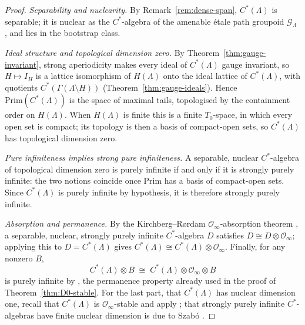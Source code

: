 \documentclass[12pt]{amsart}
\theoremstyle{plain}
\theoremstyle{definition}
\theoremstyle{remark}
\newcommand{\Prim}{\mathrm{Prim}}
\begin{document}
\begin{proof}
\emph{Separability and nuclearity.} By Remark~\ref{rem:dense-span},
$C^*(\Lambda)$ is separable; it is nuclear as the $C^*$-algebra of the
amenable étale path groupoid $\mathcal G_\Lambda$ \cite{KP2,S}, and lies in
the bootstrap class.

\emph{Ideal structure and topological dimension zero.} By
Theorem~\ref{thm:gauge-invariant}, strong aperiodicity makes every ideal of
$C^*(\Lambda)$ gauge invariant, so $H\mapsto I_H$ is a lattice isomorphism of
$H(\Lambda)$ onto the ideal lattice of $C^*(\Lambda)$, with quotients
$C^*(\Gamma(\Lambda\setminus H))$ (Theorem~\ref{thm:gauge-ideals}). Hence
$\Prim(C^*(\Lambda))$ is the space of maximal tails, topologised by the
containment order on $H(\Lambda)$. When $H(\Lambda)$ is finite this is a
finite $T_0$-space, in which every open set is compact; its topology is then a
basis of compact-open sets, so $C^*(\Lambda)$ has topological dimension zero.

\emph{Pure infiniteness implies strong pure infiniteness.} A separable,
nuclear $C^*$-algebra of topological dimension zero is purely infinite if and
only if it is strongly purely infinite: the two notions coincide once
$\Prim$ has a basis of compact-open sets.
Since $C^*(\Lambda)$ is purely infinite by hypothesis, it is therefore
strongly purely infinite.

\emph{Absorption and permanence.} By the Kirchberg--R\o rdam
$\mathcal O_\infty$-absorption theorem \cite{KR}, a separable, nuclear,
strongly purely infinite $C^*$-algebra $D$ satisfies
$D\cong D\otimes\mathcal O_\infty$; applying this to $D=C^*(\Lambda)$ gives
$C^*(\Lambda)\cong C^*(\Lambda)\otimes\mathcal O_\infty$. Finally, for any
nonzero $B$,
\[
C^*(\Lambda)\otimes B \;\cong\; C^*(\Lambda)\otimes\mathcal O_\infty\otimes B
\]
is purely infinite by \cite[Proposition~4.7]{KR}, the permanence property
already used in the proof of Theorem~\ref{thm:D0-stable}. For the last part,
that $C^*(\Lambda)$ has nuclear dimension one, recall that $C^*(\Lambda)$ is
$\mathcal O_\infty$-stable and apply \cite[Theorem~A]{BGSW}; that strongly
purely infinite $C^*$-algebras have finite nuclear dimension is due to Szab\'o
\cite{Sz}.
\end{proof}
\end{document}
